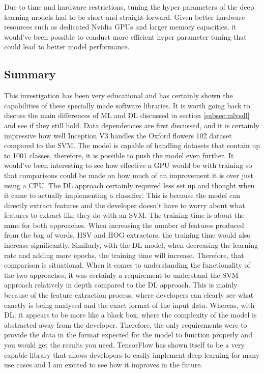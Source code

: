 \documentclass[12pt,a4paper]{report}
\begin{document}
\par

Due to time and hardware restrictions, tuning the hyper parameters of the deep learning models had to be short and 
straight-forward. Given better hardware resources such as dedicated Nvidia GPUs and larger memory capacities, 
it would've been possible to conduct more efficient hyper parameter tuning that could lead to better model performance.

\subsection{Summary}

This investigation has been very educational and has certainly shown the capabilities of these specially made software 
libraries. It is worth going back to discuss the main differences of ML and DL discussed in section \ref{subsec:mlvsdl}
and see if they 
still hold. Data dependencies are first discussed, and it is certainly impressive how well Inception V3 handles the 
Oxford flowers 102 dataset compared to the SVM. The model is capable of handling datasets that contain up to 1001 
classes, therefore, it is possible to push the model even further. It would've been interesting to see how effective a 
GPU would be with training so that comparisons could be made on how much of an improvement it is over just using a CPU. 
The DL approach certainly required less set up and thought when it came to actually implementing a classifier. This is 
because the model can directly extract features and the developer doesn't have to worry about what features to extract 
like they do with an SVM. The training time is about the same for both approaches. When increasing the number of 
features produced from the bag of words, HSV and HOG extractors, the training time would also increase significantly. 
Similarly, with the DL model, when decreasing the learning rate and adding more epochs, the training time will increase.
Therefore, that comparison is situational. When it comes to understanding the functionality of the two approaches, it 
was certainly a requirement to understand the SVM approach relatively in depth compared to the DL approach. This is 
mainly because of the feature extraction process, where developers can clearly see what exactly is being analysed and 
the exact format of the input data. Whereas, with DL, it appears to be more like a black box, where the complexity of 
the model is abstracted away from the developer. Therefore, the only requirements were to provide the data in the format
expected for the model to function properly and you would get the results you need. TensorFlow has shown itself to be a 
very capable library that allows developers to easily implement deep learning for many use cases and I am excited to see
how it improves in the future. 
\end{document}
